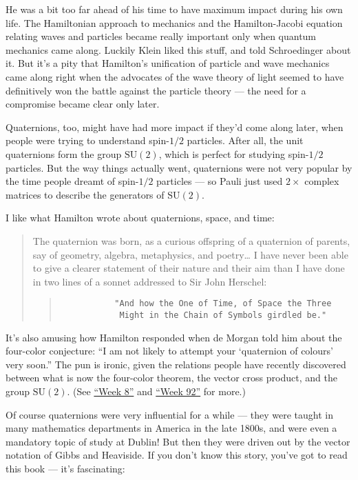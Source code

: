 \documentclass{article}
\begin{document}
He was a bit too far ahead of his time to have maximum impact during his
own life. The Hamiltonian approach to mechanics and the Hamilton-Jacobi
equation relating waves and particles became really important only when
quantum mechanics came along. Luckily Klein liked this stuff, and told
Schroedinger about it. But it's a pity that Hamilton's unification of
particle and wave mechanics came along right when the advocates of the
wave theory of light seemed to have definitively won the battle against
the particle theory --- the need for a compromise became clear only
later.

Quaternions, too, might have had more impact if they'd come along later,
when people were trying to understand spin-\(1/2\) particles. After all,
the unit quaternions form the group \(\mathrm{SU}(2)\), which is perfect
for studying spin-\(1/2\) particles. But the way things actually went,
quaternions were not very popular by the time people dreamt of
spin-\(1/2\) particles --- so Pauli just used \(2\times\) complex
matrices to describe the generators of \(\mathrm{SU}(2)\).

I like what Hamilton wrote about quaternions, space, and time:

\begin{quote}
The quaternion was born, as a curious offspring of a quaternion of
parents, say of geometry, algebra, metaphysics, and poetry\ldots{} I
have never been able to give a clearer statement of their nature and
their aim than I have done in two lines of a sonnet addressed to Sir
John Herschel:

\begin{quote}
\begin{verbatim}
           "And how the One of Time, of Space the Three
            Might in the Chain of Symbols girdled be."
\end{verbatim}
\end{quote}
\end{quote}

It's also amusing how Hamilton responded when de Morgan told him about
the four-color conjecture: ``I am not likely to attempt your `quaternion
of colours' very soon.'' The pun is ironic, given the relations people
have recently discovered between what is now the four-color theorem, the
vector cross product, and the group \(\mathrm{SU}(2)\). (See
\protect\hyperlink{week8}{``Week 8''} and
\protect\hyperlink{week92}{``Week 92''} for more.)

Of course quaternions were very influential for a while --- they were
taught in many mathematics departments in America in the late 1800s, and
were even a mandatory topic of study at Dublin! But then they were
driven out by the vector notation of Gibbs and Heaviside. If you don't
know this story, you've got to read this book --- it's fascinating:
\end{document}
